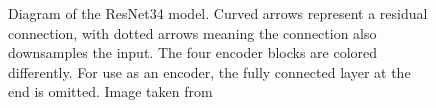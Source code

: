 \begin{figure}[htbp]
    \caption{Diagram of the ResNet34 model. Curved arrows represent a residual connection, with dotted arrows meaning the connection also downsamples the input. The four encoder blocks are colored differently. For use as an encoder, the fully connected layer at the end is omitted. Image taken from \cite{heDeepResidualLearning2015}}
    \label{fig:resnet34}
\end{figure}